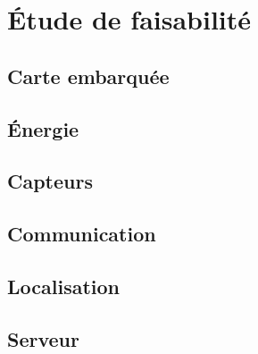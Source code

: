 \section{Étude de faisabilité}

\subsection{Carte embarquée}

\subsection{Énergie}

\subsection{Capteurs}

\subsection{Communication}

\subsection{Localisation}

\subsection{Serveur}
